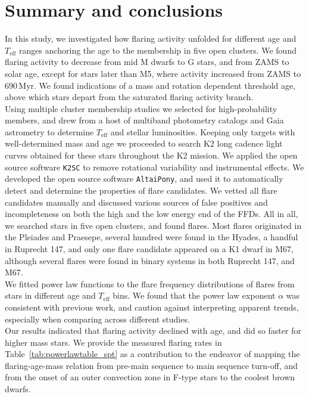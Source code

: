 \documentclass{aa}
\begin{document}
\section{Summary and conclusions}
\label{sec:summary}
In this study, we investigated how flaring activity unfolded for different age and $T_\mathrm{eff}$ ranges anchoring the age to the membership in five open clusters. We found flaring activity to decrease from mid M dwarfs to G stars, and from ZAMS to solar age, except for stars later than M5, where activity increased from ZAMS to 690\,Myr. We found indications of a mass and rotation dependent threshold age, above which stars depart from the saturated flaring activity branch.
\\
Using multiple cluster membership studies we selected for high-probability members, and drew from a host of multiband photometry catalogs and Gaia astrometry to determine $T_\mathrm{eff}$ and stellar luminosities. Keeping only targets with well-determined mass and age we proceeded to search K2 long cadence light curves obtained for these stars throughout the K2 mission. We applied the open source software \texttt{K2SC} to remove rotational variability and instrumental effects. We developed the open source software \texttt{AltaiPony}, and used it to automatically detect and determine the properties of flare candidates. We vetted all flare candidates manually and discussed various sources of false positives and incompleteness on both the high and the low energy end of the FFDs. All in all, we searched stars in five open clusters, and found flares. Most flares originated in the Pleiades and Praesepe, several hundred were found in the Hyades, a handful in Ruprecht 147, and only one flare candidate appeared on a K1 dwarf in M67, although several flares were found in binary systems in both Ruprecht 147, and M67.
\\
We fitted power law functions to the flare frequency distributions of flares from stars in different age and $T_\mathrm{eff}$ bins. We found that the power law exponent $\alpha$ was consistent with previous work, and caution against interpreting apparent trends, especially when comparing across different studies.
\\
Our results indicated that flaring activity declined with age, and did so faster for higher mass stars. We provide the measured flaring rates in Table~\ref{tab:powerlawtable_spt} as a contribution to the endeavor of mapping the flaring-age-mass relation from pre-main sequence to main sequence turn-off, and from the onset of an outer convection zone in F-type stars to the coolest brown dwarfs.
\end{document}
